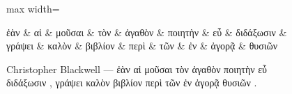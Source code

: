 \documentclass{article}
\begin{document}
\begin{figure}[ht]
\centering
\begin{adjustbox}{max width=\textwidth}
\begin{dependency}[theme = simple]
   \begin{deptext}[column sep=1.2em]
      ἐὰν \& αἱ \& μοῦσαι \& τὸν \& ἀγαθὸν \& ποιητὴν \& εὖ \& διδάξωσιν \& γράψει \& καλὸν \& βιβλίον \& περὶ \& τῶν \& ἐν \& ἀγορᾷ \& θυσιῶν \\
   \end{deptext}
\end{dependency}
\end{adjustbox}

\caption{Christopher Blackwell — ἐὰν αἱ μοῦσαι τὸν ἀγαθὸν ποιητὴν εὖ διδάξωσιν , γράψει καλὸν βιβλίον περὶ τῶν ἐν ἀγορᾷ θυσιῶν .}
\end{figure}
\end{document}
